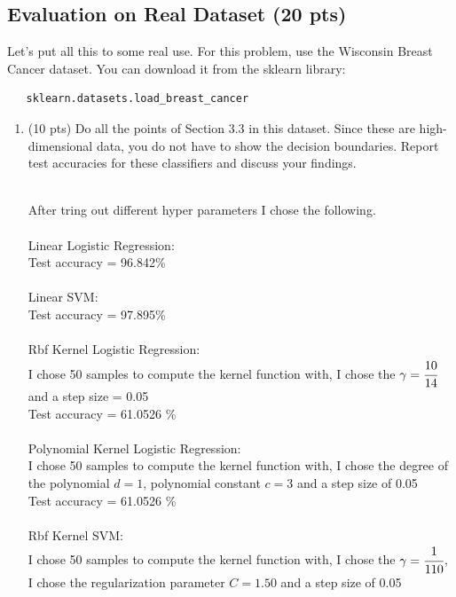 \documentclass[a4paper]{article}
\theoremstyle{definition}
\newenvironment{soln}{
    \leavevmode\color{blue}\ignorespaces
}{}
\begin{document}
\subsection{Evaluation on Real Dataset (20 pts)}
Let's put all this to some real use. For this problem, use the Wisconsin Breast Cancer dataset. You can download it from the sklearn library:
\begin{verbatim}
   sklearn.datasets.load_breast_cancer
\end{verbatim}
\begin{enumerate}
    \item  (10 pts) Do all the points of Section 3.3 in this dataset. Since these are high-dimensional data, you do not have to show the decision boundaries. Report test accuracies for these classifiers and discuss your findings.
    \begin{soln}
        \\ After tring out different hyper parameters I chose the following.\\
        \\ {\fontsize{10pt}{12pt}\selectfont Linear Logistic Regression:} 
        \\ Test accuracy = 96.842\%
        \\
        \\ {\fontsize{10pt}{12pt}\selectfont Linear SVM:} 
        \\ Test accuracy = 97.895\%
        \\
        \\ {\fontsize{10pt}{12pt}\selectfont Rbf Kernel Logistic Regression:}
        \\ I chose 50 samples to compute the kernel function with, I chose the $\gamma = \cfrac{10}{14}$ and a step size = 0.05
        \\ Test accuracy = 61.0526 \%
        \\
        \\ {\fontsize{10pt}{12pt}\selectfont Polynomial Kernel Logistic Regression:} 
        \\ I chose 50 samples to compute the kernel function with, I chose the degree of the polynomial $d = 1$, polynomial constant $c = 3$ and a step size of 0.05
        \\ Test accuracy = 61.0526 \%
        \\
        \\ {\fontsize{10pt}{12pt}\selectfont Rbf Kernel SVM:} 
        \\ I chose 50 samples to compute the kernel function with, I chose the $\gamma = \cfrac{1}{110}$, I chose the regularization parameter $C = 1.50$ and a step size of 0.05

\end{soln}
\end{enumerate}
\end{document}
